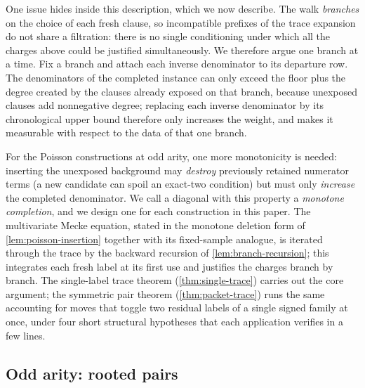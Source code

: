 \documentclass[11pt]{article}
\theoremstyle{definition}
\theoremstyle{remark}
\newcommand{\1}{\mathbf 1}
\numberwithin{equation}{section}
\begin{document}
One issue hides inside this description, which we now describe.  The walk \emph{branches} on the choice of each
fresh clause, so incompatible prefixes of the trace expansion do not
share a filtration: there is no single conditioning under which all the
charges above could be justified simultaneously.  We therefore argue one
branch at a time.  Fix a branch and attach each inverse denominator to
its departure row.  The denominators of the completed instance can only
exceed the floor plus the degree created by the clauses already exposed
on that branch,
because unexposed clauses add nonnegative degree; replacing each inverse
denominator by its chronological upper bound therefore only increases
the weight, and makes it measurable with respect to the data of that one
branch.

For the Poisson constructions at odd arity, one more monotonicity is
needed: inserting the unexposed background may \emph{destroy} previously
retained numerator terms (a new candidate can spoil an exact-two
condition) but must only \emph{increase} the completed denominator.  We
call a diagonal with this property a \emph{monotone completion}, and we
design one for each construction in this paper.  The multivariate
Mecke equation, stated in the monotone deletion form of
\cref{lem:poisson-insertion} together with its fixed-sample analogue,
is iterated through the trace
by the backward recursion of \cref{lem:branch-recursion}; this
integrates each fresh label at its first use and justifies the charges
branch by branch.  The single-label trace theorem
(\cref{thm:single-trace}) carries out the core argument; the symmetric
pair theorem (\cref{thm:packet-trace}) runs the same accounting for
moves that toggle two residual labels of a single signed family at
once, under four short structural hypotheses that each application
verifies in a few lines.

\subsection{Odd arity: rooted pairs}\label{sec:tech-odd}
\end{document}
